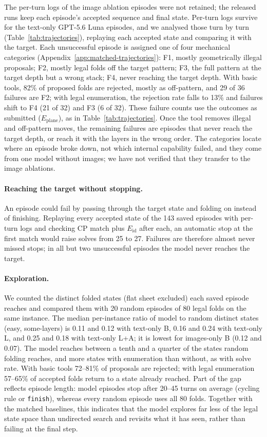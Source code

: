 The per-turn logs of the image ablation episodes were not retained; the released runs keep each
episode's accepted sequence and final state. Per-turn logs survive for the text-only GPT-5.6 Luna
episodes, and we analysed those turn by turn (Table~\ref{tab:trajectories}), replaying each
accepted state and comparing it with the target. Each unsuccessful episode is assigned one of four
mechanical categories (Appendix~\ref{app:matched-trajectories}): F1, mostly geometrically illegal
proposals; F2, mostly legal folds off the target pattern; F3, the full pattern at the target depth
but a wrong stack; F4, never reaching the target depth. With basic tools, 82\% of proposed folds
are rejected, mostly as off-pattern, and 29 of 36 failures are F2; with legal enumeration, the
rejection rate falls to 13\% and failures shift to F4 (21 of 32) and F3 (6 of 32). These failure
counts use the outcomes as submitted ($E_{\mathrm{plane}}$), as in Table~\ref{tab:trajectories}. Once the tool
removes illegal and off-pattern moves, the remaining failures are episodes that never reach the
target depth, or reach it with the layers in the wrong order. The categories locate where an
episode broke down, not which internal capability failed, and they come from one model without
images; we have not verified that they transfer to the image ablations.

\paragraph{Reaching the target without stopping.} An episode could fail by passing through the
target state and folding on instead of finishing. Replaying every accepted state of the 143 saved
episodes with per-turn logs and checking CP match plus $E_{\mathrm{id}}$ after each, an automatic
stop at the first match would raise solves from 25 to 27. Failures are therefore almost never
missed stops; in all but two unsuccessful episodes the model never reaches the target.

\paragraph{Exploration.} We counted the distinct folded states (flat sheet excluded) each saved
episode reaches and compared them with 20 random episodes of 80 legal folds on the same instance.
The median per-instance ratio of model to random distinct states (easy, some-layers) is 0.11 and
0.12 with text-only B, 0.16 and 0.24 with text-only L, and 0.25 and 0.18 with text-only L+A; it is
lowest for images-only B (0.12 and 0.07). The model reaches between a tenth and a quarter of the
states random folding reaches, and more states with enumeration than without, as with solve rate.
With basic tools 72--81\% of proposals are rejected; with legal enumeration 57--65\% of accepted
folds return to a state already reached. Part of the gap reflects episode length: model episodes
stop after 20--45 turns on average (cycling rule or \texttt{finish}), whereas every random episode
uses all 80 folds. Together with the matched baselines, this indicates that the model explores
far less of the legal state space than undirected search and revisits what it has seen, rather
than failing at the final step.

